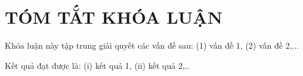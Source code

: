 \documentclass[../main-report.tex]{subfiles}
\begin{document}
\part*{TÓM TẮT KHÓA LUẬN}
Khóa luận này tập trung giải quyết các vấn đề sau: (1) vấn đề 1, (2) vấn đề 2,...

Kết quả đạt được là: (i) kết quả 1, (ii) kết quả 2,..
\end{document}
